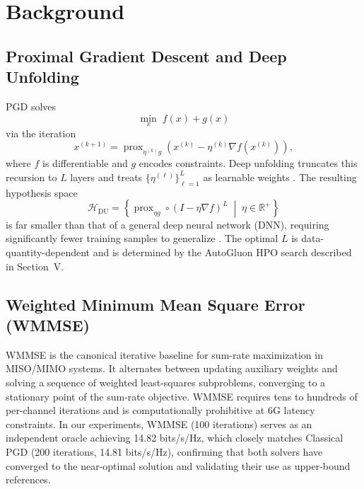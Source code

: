 \documentclass[conference,11pt]{IEEEtran}
\begin{document}
\section{Background}
\subsection{Proximal Gradient Descent and Deep Unfolding}
PGD solves
\begin{equation}
  \min_x \; f(x) + g(x)
\end{equation}
via the iteration
\begin{equation}
  x^{(k+1)} = \operatorname{prox}_{\eta^{(k)}g}\!\left(x^{(k)} - \eta^{(k)}\nabla f\!\left(x^{(k)}\right)\right),
\end{equation}
where $f$ is differentiable and $g$ encodes constraints. Deep unfolding truncates this recursion to $L$ layers and treats $\{\eta^{(\ell)}\}_{\ell=1}^{L}$ as learnable weights \cite{balatsoukas2019deepunfolding}. The resulting hypothesis space
\begin{equation}
  \mathcal{H}_{\mathrm{DU}} = \left\{\operatorname{prox}_{\eta g}\!\circ(I-\eta\nabla f)^L \;\middle|\; \eta\in\mathbb{R}^+\right\}
\end{equation}
is far smaller than that of a general deep neural network (DNN), requiring significantly fewer training samples to generalize \cite{shlezinger2025deepunfolding}. The optimal $L$ is data-quantity-dependent and is determined by the AutoGluon HPO search described in Section~V.

\subsection{Weighted Minimum Mean Square Error (WMMSE)}
WMMSE \cite{shi2011wmmse} is the canonical iterative baseline for sum-rate maximization in MISO/MIMO systems. It alternates between updating auxiliary weights and solving a sequence of weighted least-squares subproblems, converging to a stationary point of the sum-rate objective. WMMSE requires tens to hundreds of per-channel iterations and is computationally prohibitive at 6G latency constraints. In our experiments, WMMSE (100 iterations) serves as an independent oracle achieving 14.82 bits/s/Hz, which closely matches Classical PGD (200 iterations, 14.81 bits/s/Hz), confirming that both solvers have converged to the near-optimal solution and validating their use as upper-bound references.
\end{document}
